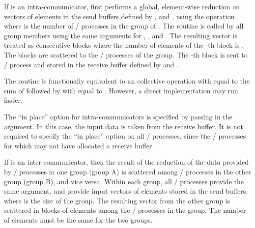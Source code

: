 If  is an intra-communicator,
 first
performs a global, element-wise reduction on vectors of
 elements in the send
buffers defined by ,  and
, using the operation , where  is the number of
\MPI/ processes in the group of . The routine is called by all group
members using the same arguments for ,
,  and .
The resulting vector is treated as  consecutive blocks where the number
of elements of the -th block is . The blocks are scattered
to the \MPI/ processes of the group. The -th block
is sent to \MPI/ process  and stored in the
receive buffer defined by  and
.


\begin{implementors}
The 
routine is functionally equivalent to
an
collective
operation
with  equal to
the sum of  followed by
 with  equal to .
However, a direct implementation may run faster.
\end{implementors}

The ``in place'' option  for intra-communicators is specified by passing
 in
the  argument.
In this case, the input data is taken from the receive
buffer. It is not required to specify the ``in
place'' option on all \MPI/ processes, since the \MPI/ processes for which
 may not have allocated a receive buffer.

If  is an inter-communicator, then the result of the reduction
of the data provided by \MPI/ processes in one
group (group A) is scattered among \MPI/ processes in
the other group (group B), and vice
versa.  Within each group, all \MPI/ processes provide the same
 argument, and provide input vectors of 
elements stored in the send buffers, where  is the size of the group.
The resulting vector from the other group is scattered in blocks of
 elements among the \MPI/ processes in the group. The number of
elements  must be the same for the two groups.

